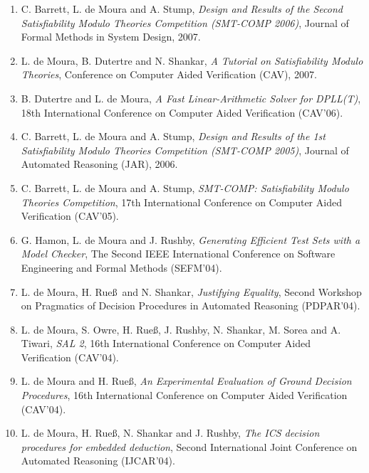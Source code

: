 \documentclass[11pt,a4paper]{article}
\begin{document}
\begin{enumerate}[leftmargin=*,itemsep=0.5ex,topsep=0.6ex]
\item C. Barrett, L. de Moura and A. Stump,
      {\em Design and Results of the Second Satisfiability Modulo Theories Competition (SMT-COMP 2006)},
      Journal of Formal Methods in System Design, 2007.

\item L. de Moura, B. Dutertre and N. Shankar,
      {\em A Tutorial on Satisfiability Modulo Theories},
      Conference on Computer Aided Verification (CAV), 2007.

\item B. Dutertre and L. de Moura,
      {\em A Fast Linear-Arithmetic Solver for DPLL(T)},
      18th International Conference on Computer Aided Verification (CAV'06).

\item C. Barrett, L. de Moura and A. Stump,
      {\em Design and Results of the 1st Satisfiability Modulo Theories Competition (SMT-COMP 2005)},
      Journal of Automated Reasoning (JAR), 2006.

\item C. Barrett, L. de Moura and A. Stump,
      {\em SMT-COMP: Satisfiability Modulo Theories Competition},
      17th International Conference on Computer Aided Verification (CAV'05).

\item G. Hamon, L. de Moura and J. Rushby,
      {\em Generating Efficient Test Sets with a Model Checker},
      The Second IEEE International Conference on Software Engineering and Formal Methods (SEFM'04).

\item L. de Moura, H. Rue\ss\ and N. Shankar,
      {\em Justifying Equality},
      Second Workshop on Pragmatics of Decision Procedures in Automated Reasoning (PDPAR'04).

\item L. de Moura, S. Owre, H. Rue\ss, J. Rushby, N. Shankar, M. Sorea and A. Tiwari,
      {\em SAL 2},
      16th International Conference on Computer Aided Verification (CAV'04).

\item L. de Moura and H. Rue\ss,
      {\em An Experimental Evaluation of Ground Decision Procedures},
      16th International Conference on Computer Aided Verification (CAV'04).

\item L. de Moura, H. Rue\ss, N. Shankar and J. Rushby,
      {\em The ICS decision procedures for embedded deduction},
      Second International Joint Conference on Automated Reasoning (IJCAR'04).


\end{enumerate}
\end{document}
